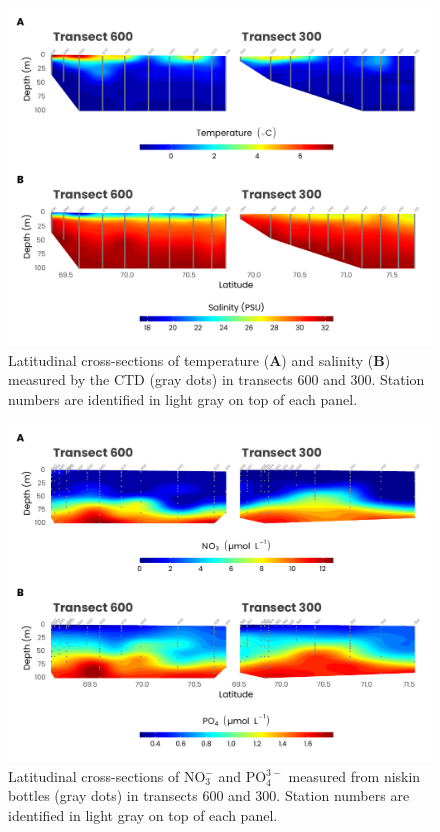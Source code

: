 \documentclass[essd, manuscript]{copernicus}
\begin{document}
\clearpage

\begin{figure}[H]
	\centering
	\includegraphics[scale = 1]{../../../graphs/fig04.pdf}
	\caption{Latitudinal cross-sections of temperature (\textbf{A}) and salinity (\textbf{B}) measured by the CTD (gray dots) in transects 600 and 300. Station numbers are identified in light gray on top of each panel.}
\end{figure}

\clearpage

\begin{figure}[H]
	\centering
	\includegraphics[scale = 1]{../../../graphs/fig05.pdf}
	\caption{Latitudinal cross-sections of NO$_3^-$ and PO$_4^{3-}$ measured from niskin bottles (gray dots) in transects 600 and 300. Station numbers are identified in light gray on top of each panel.}
\end{figure}
\end{document}
